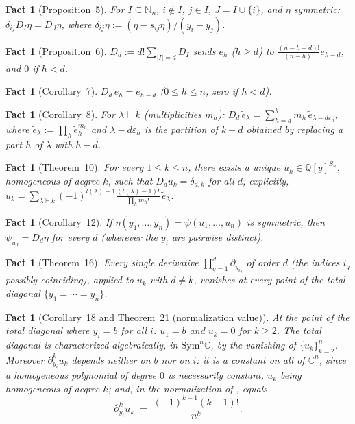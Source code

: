 \documentclass[10pt,a4paper]{amsart}
\newtheorem{fact}[theorem]{Fact}
\newcommand{\NN}{\mathbb{N}}
\newcommand{\CC}{\mathbb{C}}
\newcommand{\QQ}{\mathbb{Q}}
\begin{document}
\begin{fact}[Proposition~5]\label{fact:E}
For $I\subseteq\NN_n$, $i\notin I$, $j\in I$, $J=I\cup\{i\}$, and $\eta$ symmetric: $\delta_{ij}D_I\eta = D_J\eta$, where $\delta_{ij}\eta:=(\eta-s_{ij}\eta)/(y_i-y_j)$.
\end{fact}

\begin{fact}[Proposition~6]\label{fact:F}
$D_d:=d!\sum_{|I|=d}D_I$ sends $e_h$ ($h\ge d$) to $\frac{(n-h+d)!}{(n-h)!}e_{h-d}$, and $0$ if $h<d$.
\end{fact}

\begin{fact}[Corollary~7]\label{fact:G}
$D_d\,\tilde e_h = \tilde e_{h-d}$ ($0\le h\le n$, zero if $h<d$).
\end{fact}

\begin{fact}[Corollary~8]\label{fact:H}
For $\lambda\vdash k$ (multiplicities $m_h$): $D_d\,\tilde e_\lambda = \sum_{h=d}^k m_h\,\tilde e_{\lambda-d\varepsilon_h}$, where $\tilde e_\lambda:=\prod_h \tilde e_h^{m_h}$ and $\lambda-d\varepsilon_h$ is the partition of $k-d$ obtained by replacing a part $h$ of $\lambda$ with $h-d$.
\end{fact}

\begin{fact}[Theorem~10]\label{fact:I}
For every $1\le k\le n$, there exists a unique $u_k\in\QQ[y]^{S_n}$, homogeneous of degree $k$, such that $D_d u_k=\delta_{d,k}$ for all $d$; explicitly,
$u_k = \sum_{\lambda\vdash k}(-1)^{l(\lambda)-1}\frac{(l(\lambda)-1)!}{\prod_h m_h!}\,\tilde e_\lambda$.
\end{fact}

\begin{fact}[Corollary~12]\label{fact:J}
If $\eta(y_1,\dots,y_n)=\psi(u_1,\dots,u_n)$ is symmetric, then $\psi_{u_d}=D_d\eta$ for every $d$ (wherever the $y_i$ are pairwise distinct).
\end{fact}

\begin{fact}[Theorem~16]\label{fact:K}
Every single derivative $\prod_{q=1}^d\partial_{y_{i_q}}$ of order $d$ (the indices $i_q$ possibly coinciding), applied to $u_k$ with $d\ne k$, vanishes at every point of the total diagonal $\{y_1=\cdots=y_n\}$.
\end{fact}

\begin{fact}[Corollary~18 and Theorem~21 (normalization value)]\label{fact:L}
At the point of the total diagonal where $y_i=b$ for all $i$: $u_1=b$ and $u_k=0$ for $k\ge2$. The total diagonal is characterized algebraically, in $\mathrm{Sym}^n\CC$, by the vanishing of $\{u_k\}_{k=2}^n$. Moreover $\partial_{y_i}^k u_k$ depends neither on $b$ nor on $i$: it is a constant \emph{on all of $\CC^n$}, since a homogeneous polynomial of degree $0$ is necessarily constant, $u_k$ being homogeneous of degree $k$; and, in the normalization of \cite{Ze}, equals
\[
\partial_{y_i}^k u_k \;=\; \frac{(-1)^{k-1}(k-1)!}{n^k}.
\]
\end{fact}
\end{document}
